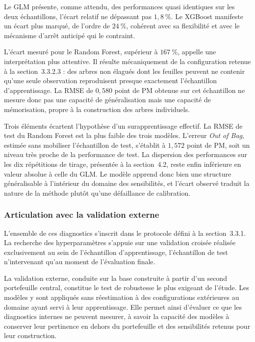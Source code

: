 Le GLM présente, comme attendu, des performances quasi identiques sur les deux
échantillons, l'écart relatif ne dépassant pas \(1{,}8~\%\). Le XGBoost
manifeste un écart plus marqué, de l'ordre de \(24~\%\), cohérent avec sa
flexibilité et avec le mécanisme d'arrêt anticipé qui le contraint.

L'écart mesuré pour le Random Forest, supérieur à \(167~\%\), appelle une
interprétation plus attentive. Il résulte mécaniquement de la configuration
retenue à la section~3.3.2.3 : des arbres non élagués dont les feuilles
peuvent ne contenir qu'une seule observation reproduisent presque exactement
l'échantillon d'apprentissage. La RMSE de \(0{,}580\) point de PM obtenue sur
cet échantillon ne mesure donc pas une capacité de généralisation mais une
capacité de mémorisation, propre à la construction des arbres individuels.

Trois éléments écartent l'hypothèse d'un surapprentissage effectif. La RMSE de
test du Random Forest est la plus faible des trois modèles. L'erreur
\emph{Out of Bag}, estimée sans mobiliser l'échantillon de test, s'établit à
\(1{,}572\) point de PM, soit un niveau très proche de la performance de test.
La dispersion des performances sur les dix répétitions de tirage, présentée à
la section~4.2, reste enfin inférieure en valeur absolue à celle du GLM. Le
modèle apprend donc bien une structure généralisable à l'intérieur du domaine
des sensibilités, et l'écart observé traduit la nature de la méthode plutôt
qu'une défaillance de calibration.

\subsubsection{Articulation avec la validation externe}

L'ensemble de ces diagnostics s'inscrit dans le protocole défini à la section~3.3.1. La 
recherche des hyperparamètres s'appuie sur une validation croisée réalisée exclusivement 
au sein de l'échantillon d'apprentissage, l'échantillon de test n'intervenant qu'au moment 
de l'évaluation finale.

La validation externe, conduite sur la base construite à partir d'un second portefeuille 
central, constitue le test de robustesse le plus exigeant de l'étude. Les modèles y sont 
appliqués sans réestimation à des configurations extérieures au domaine ayant servi à leur 
apprentissage. Elle permet ainsi d'évaluer ce que les diagnostics internes ne peuvent 
mesurer, à savoir la capacité des modèles à conserver leur pertinence en dehors du 
portefeuille et des sensibilités retenus pour leur construction.

